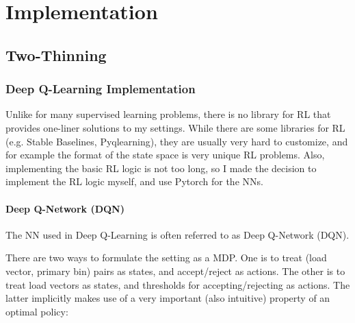 \chapter{Implementation}\label{implementation}

\ifpdf
    \graphicspath{{Chapter3/Figs/Raster/}{Chapter3/Figs/PDF/}{Chapter3/Figs/}}
\else
    \graphicspath{{Chapter3/Figs/Vector/}{Chapter3/Figs/}}
\fi

\section{Two-Thinning}


\subsection{Deep Q-Learning Implementation}


Unlike for many supervised learning problems, there is no library for RL that provides one-liner solutions to my settings. While there are some libraries for RL (e.g. Stable Baselines, Pyqlearning), they are usually very hard to customize, and for example the format of the state space is very unique RL problems. Also, implementing the basic RL logic is not too long, so I made the decision to implement the RL logic myself, and use Pytorch for the NNs.




\subsubsection{Deep Q-Network (DQN)} \label{DQN}


The NN used in Deep Q-Learning is often referred to as Deep Q-Network (DQN). 


There are two ways to formulate the \TwoThinning setting as a MDP. One is to treat (load vector, primary bin) pairs as states, and accept/reject as actions. The other is to treat load vectors as states, and thresholds for accepting/rejecting as actions. The latter implicitly makes use of a very important (also intuitive) property of an optimal policy:


